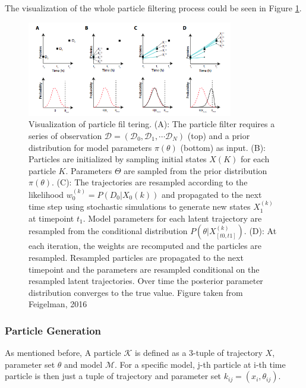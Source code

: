 \documentclass{bioinfo}
\begin{document}
The visualization of the whole particle filtering process could be seen in Figure \ref{fig:03}.

\begin{figure}[h]
\includegraphics[width=9cm]{figures/particle_filtering.png}
\caption{Visualization of particle fil	tering. (A): The particle filter requires a series of observation $\mathcal{D} = (\mathcal{D}_0, \mathcal{D}_1, \cdots \mathcal{D}_N)$ (top) and a prior distribution for model parameters $\pi(\theta)$ (bottom) as input. (B): Particles are initialized by sampling initial states $X(K)$ for each particle $K$. Parameters $\Theta$ are sampled from the prior distribution $\pi(\theta)$. (C): The trajectories are resampled according to the likelihood $w_0^{(k)} = P(D_0|X_0(k))$ and propagated to the next time step using stochastic simulations to generate new states $X_1^{(k)}$ at timepoint $t_1$. Model parameters for each latent trajectory are resampled from the conditional distribution $P(\theta|X^{(k)}_{[t0,t1]})$. (D): At each iteration, the weights are recomputed and the particles are resampled. Resampled particles are propagated to the next timepoint and the parameters are resampled conditional on the resampled latent trajectories. Over time the posterior parameter distribution converges to the true value. Figure taken from Feigelman, 2016 \citealp{Feigelman16}}  \label{fig:03}
\end{figure}

\vspace*{-6pt}

\subsubsection{Particle Generation}

As mentioned before, A particle $\mathcal{K}$ is defined as a 3-tuple of trajectory $X$, parameter set $\theta$ and model $\mathcal{M}$. For a specific model, j-th particle at i-th time particle is then just a tuple of trajectory and parameter set $k_{ij} = (x_i, \theta_{ij})$.
\end{document}
